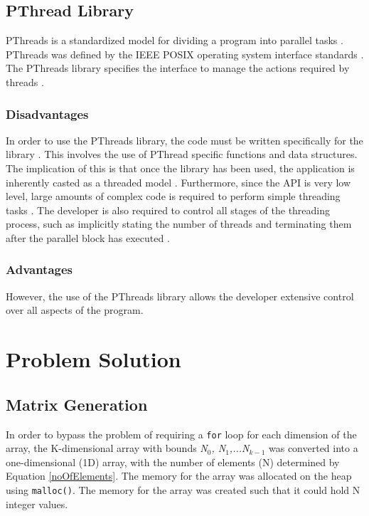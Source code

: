 \documentclass[10pt,twocolumn]{witseiepaper}
\begin{document}
\subsection{PThread Library}
PThreads is a standardized model for dividing a program into parallel tasks \cite{pthreads}. PThreads was defined by the IEEE POSIX operating system interface standards \cite{pthreads}. The PThreads library specifies the interface to manage the actions required by threads \cite{pthreadVSopen}.

\subsubsection{Disadvantages}
In order to use the PThreads library, the code must be written specifically for the library \cite{pthreadVSopen}. This involves the use of PThread specific functions and data structures. The implication of this is that once the library has been used, the application is inherently casted as a threaded model \cite{pthreadVSopen}. Furthermore, since the API is very low level, large amounts of complex code is required to perform simple threading tasks \cite{pthreadVSopen}. The developer is also required to control all stages of the threading process, such as implicitly stating the number of threads and terminating them after the parallel block has executed \cite{pthreadVSopen}.

\subsubsection{Advantages}
However, the use of the PThreads library allows the developer extensive control over all aspects of the program.

\section{Problem Solution}

\subsection{Matrix Generation}
In order to bypass the problem of requiring a \texttt{for} loop for each dimension of the array, the K-dimensional array with bounds \textit{N$_0$, N$_1$,...N$_{k-1}$} was converted into a one-dimensional (1D) array, with the number of elements (N) determined by Equation \ref{noOfElements}. The memory for the array was allocated on the heap using \texttt{malloc()}. The memory for the array was created such that it could hold N integer values.
\end{document}
